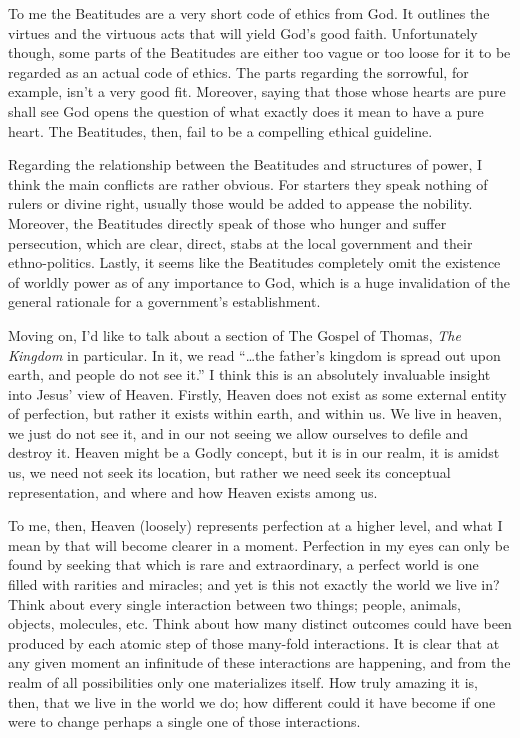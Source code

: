 \documentclass[12pt,letterpaper]{article}
\begin{document}
\begin{spacing}{2}
    To me the Beatitudes are a very short code of ethics from God. It outlines
    the virtues and the virtuous acts that will yield God's good faith.
    Unfortunately though, some parts of the Beatitudes are either too vague or
    too loose for it to be regarded as an actual code of ethics. The parts
    regarding the sorrowful, for example, isn't a very good fit. Moreover,
    saying that those whose hearts are pure shall see God opens the question of
    what exactly does it mean to have a pure heart. The Beatitudes, then, fail
    to be a compelling ethical guideline.

    Regarding the relationship between the Beatitudes and structures of power, I
    think the main conflicts are rather obvious. For starters they speak nothing
    of rulers or divine right, usually those would be added to appease the
    nobility. Moreover, the Beatitudes directly speak of those who hunger and
    suffer persecution, which are clear, direct, stabs at the local government
    and their ethno-politics. Lastly, it seems like the Beatitudes completely
    omit the existence of worldly power as of any importance to God, which is a
    huge invalidation of the general rationale for a government's establishment.

    Moving on, I'd like to talk about a section of The Gospel of Thomas,
    \emph{The Kingdom} in particular. In it, we read ``\ldots the father's
    kingdom is spread out upon earth, and people do not see it.'' I think this
    is an absolutely invaluable insight into Jesus' view of Heaven. Firstly,
    Heaven does not exist as some external entity of perfection, but rather it
    exists within earth, and within us. We live in heaven, we just do not see
    it, and in our not seeing we allow ourselves to defile and destroy it.
    Heaven might be a Godly concept, but it is in our realm, it is amidst us, we
    need not seek its location, but rather we need seek its conceptual
    representation, and where and how Heaven exists among us.

    To me, then, Heaven (loosely) represents perfection at a higher level, and
    what I mean by that will become clearer in a moment. Perfection in my eyes
    can only be found by seeking that which is rare and extraordinary, a perfect
    world is one filled with rarities and miracles; and yet is this not exactly
    the world we live in? Think about every single interaction between two
    things; people, animals, objects, molecules, etc. Think about how many
    distinct outcomes could have been produced by each atomic step of those
    many-fold interactions. It is clear that at any given moment an infinitude
    of these interactions are happening, and from the realm of all
    possibilities only one materializes itself. How truly amazing it is, then,
    that we live in the world we do; how different could it have become if one
    were to change perhaps a single one of those interactions.


\end{spacing}
\end{document}
